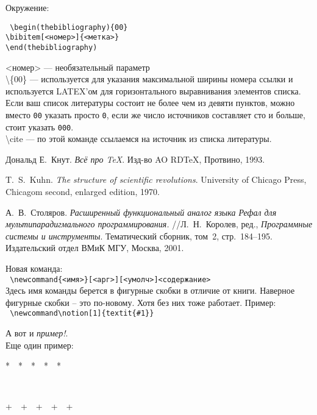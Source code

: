 \noindent
Окружение:\\
\medskip

\noindent
\texttt{
\textbackslash begin(thebibliography)\{00\}\\
\textbackslash bibitem[<номер>]\{<метка>\}\\
\textbackslash end(thebibliography)\\
}
\medskip

\noindent
<номер> --- необязательный параметр\\
\textbackslash \{00\} --- используется для указания максимальной ширины номера ссылки и используется LATEX'ом для горизонтального выравнивания элементов списка. Если ваш список литературы состоит не более чем из девяти пунктов, можно вместо \texttt{00} указать просто \texttt{0}, если же число источников составляет сто и больше, стоит указать \texttt{000}.\\
\textbackslash cite --- по этой команде ссылаемся на источник из списка литературы.

\begin{thebibliography}{00}

 Дональд Е.~Кнут.
\emph{Всё про \TeX}. Изд-во AO RDTeX,
Протвино, 1993.

 T.~S.~Kuhn.
\emph{The structure of scientific revolutions}.
University of Chicago Press,
Chicagom second, enlarged edition, 1970.

 А.~В.~Столяров.
\emph{Расширенный функциональный аналог языка Рефал для мультипарадигмального программирования.}
//Л.~Н.~Королев, ред., \emph{Программные системы и инструменты}. Тематический сборник, том~2, стр.~184--195. Издательский отдел ВМиК МГУ, Москва, 2001.

\end{thebibliography}

\clearpage

\noindent
Новая команда:\\
\texttt{
\textbackslash newcommand\{<имя>\}[<арг>][<умолч>]{<содержание>}}\\
Здесь имя команды берется в фигурные скобки в отличие от книги. Наверное фигурные скобки -- это по-новому. Хотя без них тоже работает. Пример:\\
\texttt{
\textbackslash newcommand\textbackslash notion[1]\{textit\{\#1\}\}}
\medskip

\newcommand{\notion}[1]{\textit{#1}}

\noindent
А вот и \notion{пример!}.\\
Еще один пример:\\
\newcommand{\Brief}[1][*]{
    \bigskip
    \centerline{#1~~#1~~#1~~#1~~#1}
    \bigskip
}
\Brief\\
\Brief[+]
\medskip


